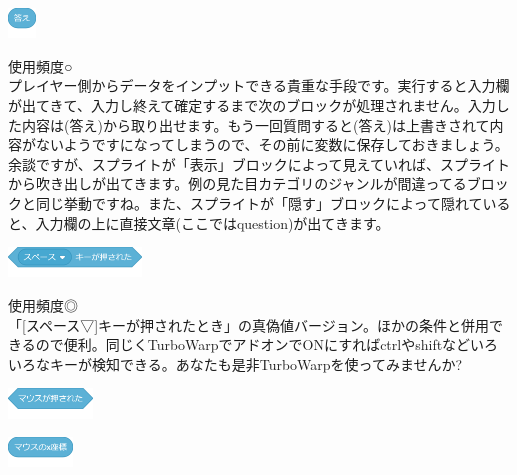\documentclass[b5paper,10pt]{jsarticle}
\begin{document}
\begin{multicols*}{3}
\begin{itembox}{5}
\includegraphics[height=8mm]{images/sensing_6.png}
\end{itembox}
使用頻度○\\
プレイヤー側からデータをインプットできる貴重な手段です。実行すると入力欄が出てきて、入力し終えて確定するまで次のブロックが処理されません。入力した内容は(答え)から取り出せます。もう一回質問すると(答え)は上書きされて内容がないようですになってしまうので、その前に変数に保存しておきましょう。余談ですが、スプライトが「表示」ブロックによって見えていれば、スプライトから吹き出しが出てきます。例の見た目カテゴリのジャンルが間違ってるブロックと同じ挙動ですね。また、スプライトが「隠す」ブロックによって隠れていると、入力欄の上に直接文章(ここではquestion)が出てきます。
\begin{itembox}{6}
\includegraphics[height=8mm]{images/sensing_7.png}
\end{itembox}
使用頻度◎\\
「[スペース▽]キーが押されたとき」の真偽値バージョン。ほかの条件と併用できるので便利。同じくTurboWarpでアドオンでONにすればctrlやshiftなどいろいろなキーが検知できる。あなたも是非TurboWarpを使ってみませんか?
\begin{itembox}{7}
\includegraphics[height=8mm]{images/sensing_8.png}

\includegraphics[height=8mm]{images/sensing_9.png}


\end{itembox}
\end{multicols*}
\end{document}
